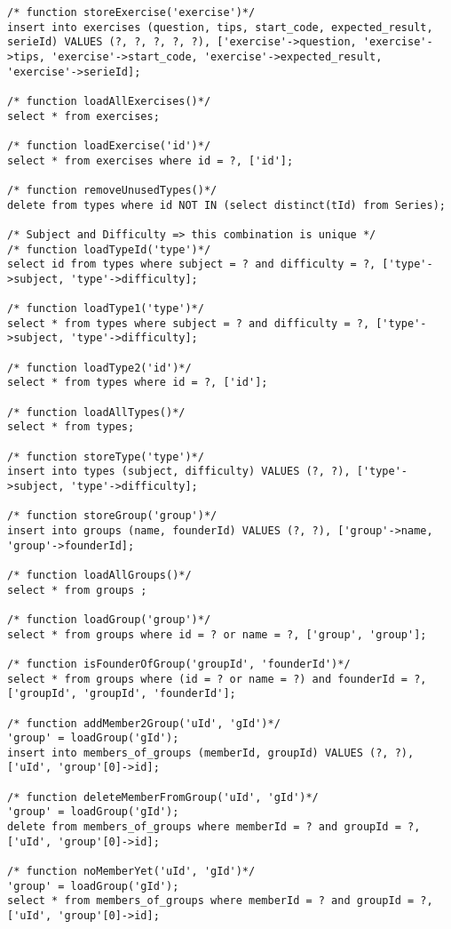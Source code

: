 \begin{lstlisting}
/* function storeExercise('exercise')*/
insert into exercises (question, tips, start_code, expected_result, serieId) VALUES (?, ?, ?, ?, ?), ['exercise'->question, 'exercise'->tips, 'exercise'->start_code, 'exercise'->expected_result, 'exercise'->serieId];

/* function loadAllExercises()*/
select * from exercises;

/* function loadExercise('id')*/
select * from exercises where id = ?, ['id'];

/* function removeUnusedTypes()*/
delete from types where id NOT IN (select distinct(tId) from Series);

/* Subject and Difficulty => this combination is unique */
/* function loadTypeId('type')*/
select id from types where subject = ? and difficulty = ?, ['type'->subject, 'type'->difficulty];

/* function loadType1('type')*/
select * from types where subject = ? and difficulty = ?, ['type'->subject, 'type'->difficulty];

/* function loadType2('id')*/
select * from types where id = ?, ['id'];

/* function loadAllTypes()*/
select * from types;

/* function storeType('type')*/
insert into types (subject, difficulty) VALUES (?, ?), ['type'->subject, 'type'->difficulty];

/* function storeGroup('group')*/
insert into groups (name, founderId) VALUES (?, ?), ['group'->name, 'group'->founderId];

/* function loadAllGroups()*/
select * from groups ;

/* function loadGroup('group')*/
select * from groups where id = ? or name = ?, ['group', 'group'];

/* function isFounderOfGroup('groupId', 'founderId')*/
select * from groups where (id = ? or name = ?) and founderId = ?,['groupId', 'groupId', 'founderId'];

/* function addMember2Group('uId', 'gId')*/
'group' = loadGroup('gId');
insert into members_of_groups (memberId, groupId) VALUES (?, ?), ['uId', 'group'[0]->id];

/* function deleteMemberFromGroup('uId', 'gId')*/
'group' = loadGroup('gId');
delete from members_of_groups where memberId = ? and groupId = ?, ['uId', 'group'[0]->id];

/* function noMemberYet('uId', 'gId')*/
'group' = loadGroup('gId');
select * from members_of_groups where memberId = ? and groupId = ?,['uId', 'group'[0]->id];


\end{lstlisting}

